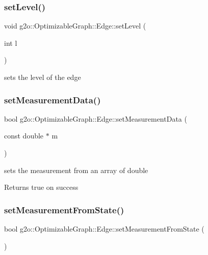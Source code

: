 \subsubsection{\texorpdfstring{set\+Level()}{setLevel()}}
{\footnotesize\ttfamily void g2o\+::\+Optimizable\+Graph\+::\+Edge\+::set\+Level (\begin{DoxyParamCaption}\item[{int}]{l }\end{DoxyParamCaption})\hspace{0.3cm}{\ttfamily [inline]}}



sets the level of the edge 

\mbox{\label{classg2o_1_1_optimizable_graph_1_1_edge_ae8d99a85921057eba87a2346ba9c6e0a}} 
\subsubsection{\texorpdfstring{set\+Measurement\+Data()}{setMeasurementData()}}
{\footnotesize\ttfamily bool g2o\+::\+Optimizable\+Graph\+::\+Edge\+::set\+Measurement\+Data (\begin{DoxyParamCaption}\item[{const double $\ast$}]{m }\end{DoxyParamCaption})\hspace{0.3cm}{\ttfamily [virtual]}}

sets the measurement from an array of double \begin{DoxyReturn}{Returns}
true on success 
\end{DoxyReturn}
\mbox{\label{classg2o_1_1_optimizable_graph_1_1_edge_a2f0b6465d6cd8b459ebc6494892c44f4}} 
\subsubsection{\texorpdfstring{set\+Measurement\+From\+State()}{setMeasurementFromState()}}
{\footnotesize\ttfamily bool g2o\+::\+Optimizable\+Graph\+::\+Edge\+::set\+Measurement\+From\+State (\begin{DoxyParamCaption}{ }\end{DoxyParamCaption})\hspace{0.3cm}{\ttfamily [virtual]}}

